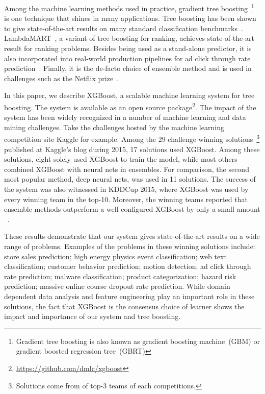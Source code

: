 \documentclass{sig-alternate-05-2015}
\begin{document}
Among the machine learning methods used in practice, gradient tree boosting~\cite{friedman2001greedy}\footnote{Gradient tree boosting is also known as gradient boosting machine~(GBM) or gradient boosted regression tree~(GBRT)} is one technique that shines in many applications.
Tree boosting has been shown to give state-of-the-art results on many standard classification benchmarks~\cite{Li10}.
LambdaMART~\cite{burges2010ranknet}, a variant of tree boosting for ranking, achieves state-of-the-art result for  ranking problems. Besides being used as a stand-alone predictor, it is also incorporated into real-world production pipelines for ad click through rate prediction~\cite{He:AdKDD}. Finally, it is the de-facto choice of ensemble method and is used in challenges such as the Netflix prize~\cite{bennett2007netflix}.

In this paper, we describe XGBoost, a scalable machine learning system for tree boosting. The system is available as an open source package\footnote{\url{https://github.com/dmlc/xgboost}}.
The impact of the system has been widely recognized in a number of machine learning and data mining challenges.
Take the challenges hosted by the machine learning competition site Kaggle for example.  Among the 29 challenge winning solutions~\footnote{Solutions come from of top-3 teams of each competitions.} published at Kaggle's blog during 2015, 17 solutions used XGBoost.  Among these solutions, eight solely used XGBoost to train the model, while most others combined XGBoost with neural nets in ensembles.
For comparison, the second most popular method, deep neural nets, was used in 11 solutions.
The success of the system was also witnessed in KDDCup 2015, where XGBoost was used by every winning team in the top-10.
Moreover, the winning teams reported that ensemble methods outperform a well-configured XGBoost by only a small amount ~\cite{Bekkerman:KDDCup}.

These results demonstrate that our system gives state-of-the-art results on a wide range of problems. Examples of the problems in these winning solutions include: store sales prediction; high energy physics event classification; web text classification; customer behavior prediction; motion detection; ad click through rate prediction; malware classification; product categorization; hazard risk prediction; massive online course dropout rate prediction.
While domain dependent data analysis and feature engineering play an important role in these solutions, the fact that XGBoost is the consensus choice of learner shows the impact and importance of our system and tree boosting.
\end{document}
